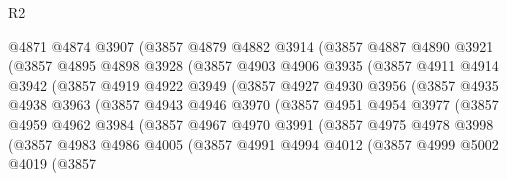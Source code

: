 \begin{lexlean}{R2}
\begin{coremodule}
                @4871
                @4874
                @3907
                (@3857
                  @4879
                  @4882
                  @3914
                  (@3857
                    @4887
                    @4890
                    @3921
                    (@3857
                      @4895
                      @4898
                      @3928
                      (@3857
                        @4903
                        @4906
                        @3935
                        (@3857
                          @4911
                          @4914
                          @3942
                          (@3857
                            @4919
                            @4922
                            @3949
                            (@3857
                              @4927
                              @4930
                              @3956
                              (@3857
                                @4935
                                @4938
                                @3963
                                (@3857
                                  @4943
                                  @4946
                                  @3970
                                  (@3857
                                    @4951
                                    @4954
                                    @3977
                                    (@3857
                                      @4959
                                      @4962
                                      @3984
                                      (@3857
                                        @4967
                                        @4970
                                        @3991
                                        (@3857
                                          @4975
                                          @4978
                                          @3998
                                          (@3857
                                            @4983
                                            @4986
                                            @4005
                                            (@3857
                                              @4991
                                              @4994
                                              @4012
                                              (@3857
                                                @4999
                                                @5002
                                                @4019
                                                (@3857

\end{coremodule}
\end{lexlean}
